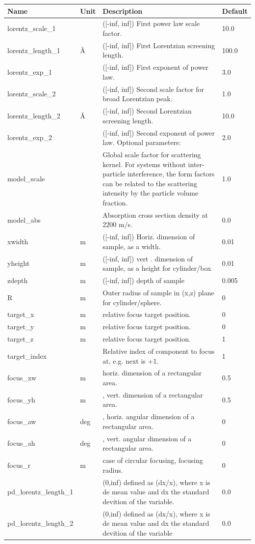 \begin{longtable}{p{}p{}p{}p{}}
\toprule
\textbf{Name} & \textbf{Unit} & \textbf{Description} & \textbf{Default} \\
\midrule
\endhead
lorentz\_scale\_1 &  & ([-inf, inf]) First power law scale factor. & 10.0 \\
lorentz\_length\_1 & \AA{} & ([-inf, inf]) First Lorentzian screening length. & 100.0 \\
lorentz\_exp\_1 &  & ([-inf, inf]) First exponent of power law. & 3.0 \\
lorentz\_scale\_2 &  & ([-inf, inf]) Second scale factor for broad Lorentzian peak. & 1.0 \\
lorentz\_length\_2 & \AA{} & ([-inf, inf]) Second Lorentzian screening length. & 10.0 \\
lorentz\_exp\_2 &  & ([-inf, inf]) Second exponent of power law. Optional parameters: & 2.0 \\
model\_scale &   & Global scale factor for scattering kernel. For systems without inter-particle interference, the form factors can be related to the scattering intensity by the particle volume fraction. & 1.0 \\
model\_abs &   & Absorption cross section density at 2200 m/s. & 0.0 \\
xwidth & m & ([-inf, inf]) Horiz. dimension of sample, as a width. & 0.01 \\
yheight & m & ([-inf, inf]) vert . dimension of sample, as a height for cylinder/box & 0.01 \\
zdepth & m & ([-inf, inf]) depth of sample & 0.005 \\
R & m & Outer radius of sample in (x,z) plane for cylinder/sphere. & 0 \\
target\_x & m & relative focus target position. & 0 \\
target\_y & m & relative focus target position. & 0 \\
target\_z & m & relative focus target position. & 1 \\
target\_index &   & Relative index of component to focus at, e.g. next is +1. & 1 \\
focus\_xw & m & horiz. dimension of a rectangular area. & 0.5 \\
focus\_yh & m & , vert. dimension of a rectangular area. & 0.5 \\
focus\_aw & deg & , horiz. angular dimension of a rectangular area. & 0 \\
focus\_ah & deg & , vert. angular dimension of a rectangular area. & 0 \\
focus\_r & m & case of circular focusing, focusing radius. & 0 \\
pd\_lorentz\_length\_1 &  & (0,inf) defined as (dx/x), where x is de mean value and dx the standard devition of the variable. & 0.0 \\
pd\_lorentz\_length\_2 &  & (0,inf) defined as (dx/x), where x is de mean value and dx the standard devition of the variable & 0.0 \\
\bottomrule
\end{longtable}

